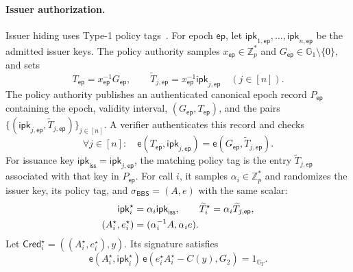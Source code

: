 \documentclass[letterpaper]{article}
\newcommand{\pair}{\mathsf{e}}
\newcommand{\Zp}{\mathbb{Z}_p}
\begin{document}
\paragraph{Issuer authorization.}
\label{app:issuer-hidden-auth}
Issuer hiding uses Type-1 policy tags~\cite{flamini2026issuerhidingbbs}.  For
epoch \(\mathsf{ep}\), let \(\mathsf{ipk}_{1,\mathsf{ep}},\ldots,
\mathsf{ipk}_{n,\mathsf{ep}}\) be the admitted issuer keys.  The policy
authority samples \(x_{\mathsf{ep}}\in\Zp^\ast\) and
\(G_{\mathsf{ep}}\in\mathbb G_1\setminus\{0\}\), and sets
\begin{equation}
  T_{\mathsf{ep}}=x_{\mathsf{ep}}^{-1}G_{\mathsf{ep}},\qquad
  \widetilde T_{j,\mathsf{ep}}
  =x_{\mathsf{ep}}^{-1}\mathsf{ipk}_{j,\mathsf{ep}}\quad(j\in[n]).
\label{eq:group-status-credential}
\end{equation}
The policy authority publishes an authenticated canonical epoch record
\(P_{\mathsf{ep}}\) containing the epoch, validity interval,
\((G_{\mathsf{ep}},T_{\mathsf{ep}})\), and the pairs
\(\{(\mathsf{ipk}_{j,\mathsf{ep}},\widetilde
T_{j,\mathsf{ep}})\}_{j\in[n]}\).  A verifier authenticates this record and
checks
\begin{equation}
  \forall j\in[n]:\quad
  \pair(T_{\mathsf{ep}},\mathsf{ipk}_{j,\mathsf{ep}})
  =\pair(G_{\mathsf{ep}},\widetilde T_{j,\mathsf{ep}}).
\label{eq:group-status-verify}
\end{equation}
For issuance key
\(\mathsf{ipk}_{\mathsf{iss}}=\mathsf{ipk}_{j,\mathsf{ep}}\), the matching
policy tag is the entry \(\widetilde T_{j,\mathsf{ep}}\) associated with that
key in \(P_{\mathsf{ep}}\).
For call \(i\), it samples \(\alpha_i\in\Zp^\ast\) and randomizes the issuer
key, its policy tag, and \(\sigma_{\mathsf{BBS}}=(A,e)\) with the same scalar:
\begin{equation}
\ifdefined\MMAAAITwoColumn
  \begin{aligned}
  \mathsf{ipk}_i^\star&=\alpha_i\mathsf{ipk}_{\mathsf{iss}},\qquad
  \widetilde T_i^\star=\alpha_i\widetilde T_{j,\mathsf{ep}},\\
  (A_i^\star,e_i^\star)&=(\alpha_i^{-1}A,\alpha_i e).
  \end{aligned}
\else
  \mathsf{ipk}_i^\star=\alpha_i\mathsf{ipk}_{\mathsf{iss}},\quad
  \widetilde T_i^\star=\alpha_i\widetilde T_{j,\mathsf{ep}},\quad
  (A_i^\star,e_i^\star)=(\alpha_i^{-1}A,\alpha_i e).
\fi
\label{eq:bbs-adapt}
\end{equation}
Let \(\mathsf{Cred}_i^\star=((A_i^\star,e_i^\star),y)\).  Its signature
satisfies
\begin{equation}
  \pair(A_i^\star,\mathsf{ipk}_i^\star)\,
  \pair(e_i^\star A_i^\star-C(y),G_2)=1_{\mathbb G_T}.
\label{eq:bbs-adapt-verify}
\end{equation}
\end{document}
